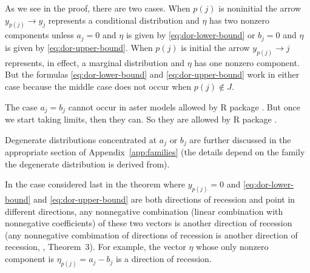 As we see in the proof, there are two cases.  When $p(j)$ is noninitial
the arrow $y_{p(j)} \longrightarrow y_j$ represents a conditional
distribution and $\eta$ has two nonzero components unless $a_j = 0$ and
$\eta$ is given by \eqref{eq:dor-lower-bound} or $b_j = 0$ and
$\eta$ is given by \eqref{eq:dor-upper-bound}.
When $p(j)$ is initial the arrow $y_{p(j)} \longrightarrow j$ represents,
in effect, a marginal distribution and $\eta$ has one nonzero component.
But the formulas \eqref{eq:dor-lower-bound} and \eqref{eq:dor-upper-bound}
work in either case because the middle case does not occur when
$p(j) \notin J$.

The case $a_j = b_j$ cannot occur in aster models allowed
by R package .  But once we start
taking limits, then they can.  So they are allowed by R package .

Degenerate distributions concentrated at $a_j$ or $b_j$ are further
discussed in the appropriate section of Appendix~\ref{app:families}
(the details depend on the family the degenerate distribution is derived
from).

In the case considered last in the theorem where $y_{p(j)} = 0$ and
\eqref{eq:dor-lower-bound} and \eqref{eq:dor-upper-bound} are both
directions of recession and point in different directions, any nonnegative
combination (linear combination with nonnegative coefficients) of these
two vectors is another direction of recession (any nonnegative combimation
of directions of recession is another direction of recession,
\citealp{geyer-gdor}, Theorem~3).  For example, the vector $\eta$ whose
only nonzero component is $\eta_{p(j)} = a_j - b_j$ is a direction
of recession.

